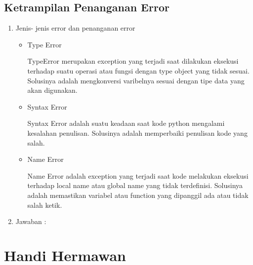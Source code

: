 \subsection{Ketrampilan Penanganan Error}
\begin{enumerate}
    \item Jenis- jenis error dan penanganan error
    \begin{itemize}
    \item Type Error
    \par TypeError merupakan exception yang terjadi saat dilakukan eksekusi terhadap suatu operasi atau fungsi dengan type object yang tidak sesuai. Solusinya adalah mengkonversi varibelnya sesuai dengan tipe data yang akan digunakan.
    \item Syntax Error
    \par Syntax Error adalah suatu keadaan saat kode python mengalami kesalahan penulisan. Solusinya adalah memperbaiki penulisan kode yang salah.
    \item Name Error
    \par Name Error adalah exception yang terjadi saat kode melakukan eksekusi terhadap local name atau global name yang tidak terdefinisi. Solusinya adalah memastikan variabel atau function yang dipanggil ada atau tidak salah ketik.
    \end{itemize}
    \item Jawaban :
    
\end{enumerate}


\section{Handi Hermawan}
